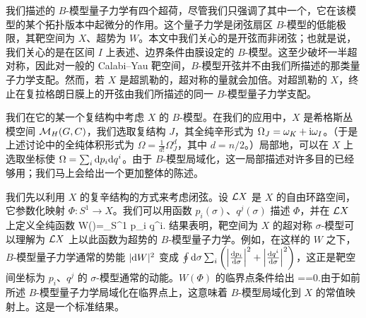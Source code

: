 我们描述的 $B$-模型量子力学有四个超荷，尽管我们只强调了其中一个，它在该模型的某个拓扑版本中起微分的作用。这个量子力学是闭弦扇区 $B$-模型的低能极限，其靶空间为 $X$、超势为 $W$。本文中我们关心的是开弦而非闭弦；也就是说，我们关心的是在区间 $I$ 上表述、边界条件由膜设定的 $B$-模型。这至少破坏一半超对称，因此对一般的 Calabi–Yau 靶空间，$B$-模型开弦并不由我们所描述的那类量子力学支配。然而，若 $X$ 是超凯勒的，超对称的量就会加倍。对超凯勒的 $X$，终止在复拉格朗日膜上的开弦由我们所描述的同一 $B$-模型量子力学支配。

我们在它的某一个复结构中考虑 $X$ 的 $B$-模型。在我们的应用中，$X$ 是希格斯丛模空间 ${\mathcal M}_H(G,C)$，我们选取复结构 $J$，其全纯辛形式为 $\Omega_J=\omega_K+{\mathrm i}\omega_I$。（于是上述讨论中的全纯体积形式为 $\varOmega=\frac{1}{d!}\Omega_J^d$，其中 $d=n/2$。）局部地，可以在 $X$ 上选取坐标使 $\Omega=\sum_i {\mathrm d} p_i {\mathrm d} q^i$。由于 $B$-模型局域化，这一局部描述对许多目的已经够用；我们马上会给出一个更加整体的陈述。

我们先以利用 $X$ 的复辛结构的方式来考虑闭弦。设 ${\mathcal L} X$ 是 $X$ 的自由环路空间，它参数化映射 $\Phi:S^1\to X$。我们可以用函数 $p_i(\sigma)$、$q^j(\sigma)$ 描述 $\Phi$，并在 ${\mathcal L} X$ 上定义全纯函数
\be\label{knon} W(\Phi)=\oint_{S^1} p_i \d q^i. \ee
结果表明，靶空间为 $X$ 的超对称 $\sigma$-模型可以理解为 ${\mathcal L} X$ 上以此函数为超势的 $B$-模型量子力学。例如，在这样的 $W$ 之下，$B$-模型量子力学通常的势能 $|{\mathrm d} W|^2$ 变成 $\oint{\mathrm d}\sigma \sum_i\left(\left|\frac{{\mathrm d} p_i}{{\mathrm d} \sigma}\right|^2
+\left|\frac{{\mathrm d} q^i}{{\mathrm d} \sigma}\right|^2\right)$，这正是靶空间坐标为 $p_i$、$q^j$ 的 $\sigma$-模型通常的动能。$W(\Phi)$ 的临界点条件给出
\be\label{nonj}==0.\ee  由于如前所述 $B$-模型量子力学局域化在临界点上，这意味着 $B$-模型局域化到 $X$ 的常值映射上。这是一个标准结果。


